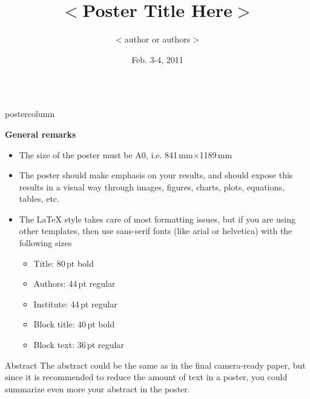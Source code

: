 \documentclass[final,hyperref={pdfpagelabels=false}]{beamer}
\title{\huge $<$Poster Title Here$>$}
\author{$<$author or authors$>$}
\institute[$<$Short institute$>$]{$<$Department or Lab, University, City$>$}
\date[Feb. 3-4, 2011]{Feb. 3-4, 2011}
\newlength{\columnheight}
\begin{document}
\begin{frame}
  \begin{columns}
    \begin{column}{.49\textwidth}
      \begin{beamercolorbox}[center,wd=\textwidth]{postercolumn}
        \begin{minipage}[T]{.95\textwidth}  
          \parbox[t][\columnheight]{\textwidth}{
            {\large{\textbf{General remarks}}}
            \begin{itemize}
            \item The size of the poster must be A0, i.e. 841\,mm$\times$1189\,mm
            \item The poster should make emphasis on your results, and should expose this
              results in a visual way through images, figures, charts, plots, equations, tables,
              etc.
            \item The LaTeX style takes care of most formatting issues, but if you are using 
              other templates, then use sans-serif fonts (like arial or helvetica) with the
              following sizes
              \begin{itemize}
              \item Title: 80\,pt bold
              \item Authors: 44\,pt regular
              \item Institute: 44\,pt regular
              \item Block title: 40\,pt bold
              \item Block text: 36\,pt regular
              \end{itemize}
            \end{itemize}

            \vfill

            \begin{block}{Abstract}
              The abstract could be the same as in the final camera-ready paper, but since
              it is recommended to reduce the amount of text in a poster, you could summarize even
              more your abstract in the poster.
            \end{block}

}
\end{minipage}
\end{beamercolorbox}
\end{column}
\end{columns}
\end{frame}
\end{document}
